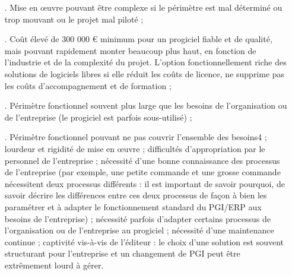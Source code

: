 \begin{itemize}
\item[.]Mise en œuvre pouvant être complexe si le périmètre est mal déterminé ou trop mouvant ou le projet mal piloté ;
\item[.]Coût élevé de 300 000 € minimum pour un progiciel fiable et de qualité, mais pouvant rapidement monter beaucoup plus haut, en fonction de l'industrie et de la complexité du projet. L'option fonctionnellement riche des solutions de logiciels libres si elle réduit les coûts de licence, ne supprime pas les coûts d'accompagnement et de formation ;
\item[.]Périmètre fonctionnel souvent plus large que les besoins de l'organisation ou de l'entreprise (le progiciel est parfois sous-utilisé) ;
\item[.]Périmètre fonctionnel pouvant ne pas couvrir l'ensemble des besoins4 ;
    lourdeur et rigidité de mise en œuvre ;
    difficultés d'appropriation par le personnel de l'entreprise ;
    nécessité d'une bonne connaissance des processus de l'entreprise (par exemple, une petite commande et une grosse commande nécessitent deux processus différents : il est important de savoir pourquoi, de savoir décrire les différences entre ces deux processus de façon à bien les paramétrer et à adapter le fonctionnement standard du PGI/ERP aux besoins de l'entreprise) ;
    nécessité parfois d'adapter certains processus de l'organisation ou de l'entreprise au progiciel ;
    nécessité d'une maintenance continue ;
    captivité vis-à-vis de l'éditeur : le choix d'une solution est souvent structurant pour l'entreprise et un changement de PGI peut être extrêmement lourd à gérer.


\end{itemize}
